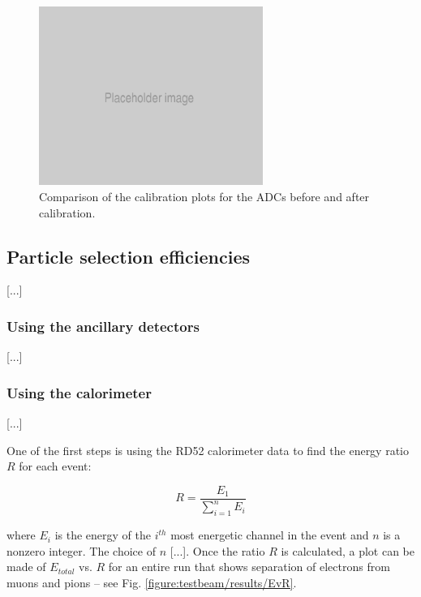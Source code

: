 \begin{figure}[h]
	\centering
	\includegraphics[width=0.65\textwidth]{../Pictures/Placeholder.png}
	\caption{Comparison of the calibration plots for the ADCs before and after calibration.}
	\label{figure:testbeam/results/calibrationafter}
\end{figure}

\subsection{Particle selection efficiencies}
[...]

\subsubsection{Using the ancillary detectors}
[...]

\subsubsection{Using the calorimeter}
[...]

One of the first steps is using the RD52 calorimeter data to find the energy ratio $R$ for each event:

\begin{displaymath}
	R = \frac{E_1}{\sum_{i=1}^{n} E_i}
\end{displaymath}

where $E_i$ is the energy of the $i^{th}$ most energetic channel in the event and $n$ is a nonzero integer. The choice of $n$ [...]. Once the ratio $R$ is calculated, a plot can be made of $E_{total}$ vs. $R$ for an entire run that shows separation of electrons from muons and pions -- see Fig. \ref{figure:testbeam/results/EvR}.



